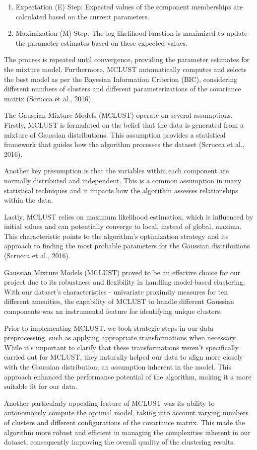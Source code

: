 \documentclass[11pt, a4paper]{article}
\begin{document}
\begin{enumerate}
\item Expectation (E) Step: Expected values of the component memberships are calculated based on the current parameters.
\item Maximization (M) Step: The log-likelihood function is maximized to update the parameter estimates based on these expected values.
\end{enumerate}

The process is repeated until convergence, providing the parameter estimates for the mixture model. Furthermore, MCLUST automatically computes and selects the best model as per the Bayesian Information Criterion (BIC), considering different numbers of clusters and different parameterizations of the covariance matrix (Scrucca et al., 2016).
\par
The Gaussian Mixture Models (MCLUST) operate on several assumptions. Firstly, MCLUST is formulated on the belief that the data is generated from a mixture of Gaussian distributions. This assumption provides a statistical framework that guides how the algorithm processes the dataset (Scrucca et al., 2016).
\par
Another key presumption is that the variables within each component are normally distributed and independent. This is a common assumption in many statistical techniques and it impacts how the algorithm assesses relationships within the data.
\par
Lastly, MCLUST relies on maximum likelihood estimation, which is influenced by initial values and can potentially converge to local, instead of global, maxima. This characteristic points to the algorithm's optimization strategy and its approach to finding the most probable parameters for the Gaussian distributions (Scrucca et al., 2016).
\par
Gaussian Mixture Models (MCLUST) proved to be an effective choice for our project due to its robustness and flexibility in handling model-based clustering. With our dataset's characteristics - univariate proximity measures for ten different amenities, the capability of MCLUST to handle different Gaussian components was an instrumental feature for identifying unique clusters.
\par
Prior to implementing MCLUST, we took strategic steps in our data preprocessing, such as applying appropriate transformations when necessary. While it's important to clarify that these transformations weren't specifically carried out for MCLUST, they naturally helped our data to align more closely with the Gaussian distribution, an assumption inherent in the model. This approach enhanced the performance potential of the algorithm, making it a more suitable fit for our data.
\par
Another particularly appealing feature of MCLUST was its ability to autonomously compute the optimal model, taking into account varying numbers of clusters and different configurations of the covariance matrix. This made the algorithm more robust and efficient in managing the complexities inherent in our dataset, consequently improving the overall quality of the clustering results.
\end{document}
